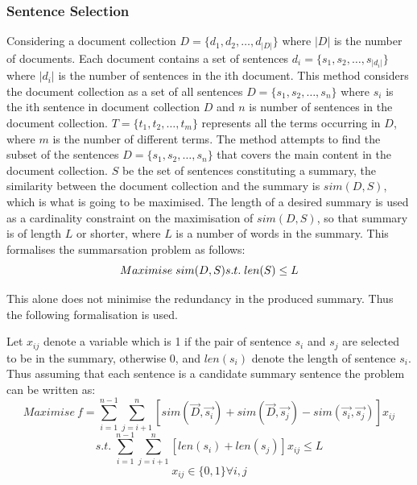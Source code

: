 \subsubsection{Sentence Selection}
Considering a document collection $D = \{d_1,d_2,\dots, d_{|D|}\}$ where $|D|$ is the number of documents. Each document contains a set of sentences $d_i = \{s_1,s_2,\dots,s_{|d_i|}\}$ where $|d_i|$ is the number of sentences in the ith document. This method considers the document collection as a set of all sentences $D = \{s_1,s_2,\dots,s_n\}$ where $s_i$ is the ith sentence in document collection $D$ and $n$ is number of sentences in the document collection. $T = \{t_1,t_2,\dots,t_m\}$ represents all the terms occurring in $D$, where $m$ is the number of different terms. The method attempts to find the subset of the sentences  $D = \{s_1,s_2,\dots,s_n\}$ that covers the main content in the document collection. $S$ be the set of sentences constituting a summary, the similarity between the document collection and the summary is $sim(D,S)$, which is what is going to be maximised. The length of a desired summary is used as a cardinality constraint on the maximisation of $sim(D,S)$, so that summary is of length $L$ or shorter, where $L$ is a number of words in the summary. This formalises the summarsation problem as follows:
\begin{equation}
    Maximise \; sim(D,S) \\
    s.t. \; len(S) \leq L
    \label{mcmrSimple}
\end{equation}

This alone does not minimise the redundancy in the produced summary. Thus the following formalisation is used. 

Let $x_{ij}$ denote a variable which is 1 if the pair of sentence $s_i$ and $s_j$ are selected to be in the summary, otherwise 0, and $len(s_i)$ denote the length of sentence $s_i$. Thus assuming that each sentence is a candidate summary sentence the problem can be written as:
\begin{equation}
    Maximise \: f = \sum_{i=1}^{n-1} \sum_{j=i+1}^n [sim(\vec{D}, \vec{s_i}) + sim(\vec{D}, \vec{s_j}) - sim(\vec{s_i}, \vec{s_j})]x_{ij}
    \label{mcmrGeneral}
\end{equation}
\begin{equation}
    s.t. \; \sum_{i=1}^{n-1} \sum_{j=i+1}^n [len(s_i) + len(s_j)]x_{ij} \leq L
    \label{mcmrConstraint}
\end{equation}
\begin{equation}
    x_{ij} \in \{0,1\} \forall i,j
    \label{mcmrVar}
\end{equation}

